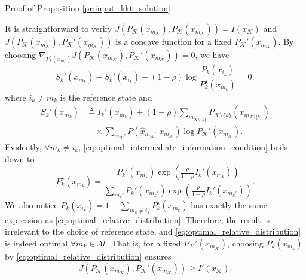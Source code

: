 \documentclass[journal]{IEEEtran}
\begin{document}
\begin{appendix}
\begin{subsection}{Proof of Proposition \ref{pr:input_kkt_solution}}
\begin{figure}[!b]
		\end{figure}
		It is straightforward to verify $J \left( P_{\mathcal{K}}(x_{m_{\mathcal{K}}}),P_{\mathcal{K}}(x_{m_{\mathcal{K}}}) \right) = I(x_{\mathcal{K}})$ and $J \left( P_{\mathcal{K}}(x_{m_{\mathcal{K}}}),P_{\mathcal{K}}'(x_{m_{\mathcal{K}}}) \right)$ is a concave function for a fixed $P_{\mathcal{K}}'(x_{m_{\mathcal{K}}})$.
		By choosing $\nabla_{P_k^\star(x_{m_k})} J \left( P_{\mathcal{K}}(x_{m_{\mathcal{K}}}),P_{\mathcal{K}}'(x_{m_{\mathcal{K}}}) \right) = 0$, we have
		\begin{equation}
			S_k'(x_{m_k}) - S_k'(x_{i_k}) + (1 - \rho) \log \frac{P_k(x_{i_k})}{P_k^\star(x_{m_k})} = 0,
			\label{eq:optimal_intermediate_information_condition}
		\end{equation}
		where $i_k \ne m_k$ is the reference state and
		\begin{align}
			S_k'(x_{m_k})
			 & \triangleq I_k'(x_{m_k}) + (1 - \rho) \sum_{m_{\mathcal{K} \setminus \{k\}}} P_{\mathcal{K} \setminus \{k\}}(x_{m_{\mathcal{K} \setminus \{k\}}})\nonumber \\
			 & \quad \times \sum_{m_{\mathcal{K}}'} P(\hat{x}_{m_{\mathcal{K}}'}|x_{m_{\mathcal{K}}}) \log P_{\mathcal{K}}'(x_{m_{\mathcal{K}}}).
		\end{align}
		Evidently, $\forall m_k \ne i_k$, \eqref{eq:optimal_intermediate_information_condition} boils down to
		\begin{equation}
			P_k^\star(x_{m_k}) = \frac{P_k'(x_{m_k}) \exp \left( \frac{\rho}{1 - \rho} I_k'(x_{m_k}) \right)}{\sum_{m_k'} P_k'(x_{m_k'}) \exp \left( \frac{\rho}{1 - \rho} I_k'(x_{m_k'}) \right)}.
			\label{eq:optimal_relative_distribution}
		\end{equation}
		We also notice $P_k(x_{i_k}) = 1 - \sum_{m_k \ne i_k} P_k^\star(x_{m_k})$ has exactly the same expression as \eqref{eq:optimal_relative_distribution}.
		Therefore, the result is irrelevant to the choice of reference state, and \eqref{eq:optimal_relative_distribution} is indeed optimal $\forall m_k \in \mathcal{M}$.
		That is, for a fixed $P_{\mathcal{K}}'(x_{m_{\mathcal{K}}})$, choosing $P_k(x_{m_k})$ by \eqref{eq:optimal_relative_distribution} ensures
		\begin{equation}
			J \left( P_{\mathcal{K}}(x_{m_{\mathcal{K}}}),P_{\mathcal{K}}'(x_{m_{\mathcal{K}}}) \right) \ge I'(x_{\mathcal{K}}).

\end{equation}
\end{subsection}
\end{appendix}
\end{document}
